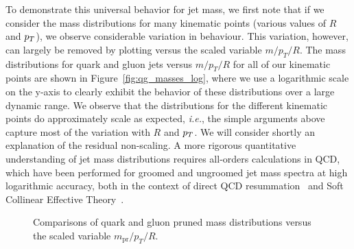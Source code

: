 To demonstrate this universal behavior for jet mass, we first note that if we consider the mass distributions for many kinematic points (various values of $R$ and $p_T$),
we observe considerable variation in behaviour. This variation, however, can largely be removed by plotting versus the scaled variable $m/p_T/R$.  The mass distributions for quark and gluon jets versus $m/p_T/R$ for all of our kinematic points 
are shown in Figure~\ref{fig:qg_masses_log}, where
we use a logarithmic scale on the y-axis to clearly exhibit the behavior of these distributions over a large dynamic range.  We observe that the distributions
for the different kinematic points do approximately scale as expected, \textit{i.e.}, the simple arguments above capture most of the variation with $R$ and $p_T$.
We will consider shortly an explanation of the residual non-scaling. A
more rigorous quantitative understanding of jet mass distributions
requires all-orders calculations in QCD, which have been performed for
groomed and ungroomed jet mass spectra at high logarithmic accuracy, both in the context of direct QCD resummation~\cite{Li:2012bw,Dasgupta:2012hg,Dasgupta:2013ihk,Dasgupta:2013via} and Soft Collinear Effective Theory~\cite{Chien:2012ur,Jouttenus:2013hs}. 

\begin{figure}
\centering
{}
\caption{Comparisons of quark and gluon pruned mass distributions versus the scaled variable $m_\text{pr}/p_T/R$. }
\label{fig:qg_prmasses_log}
\end{figure}

